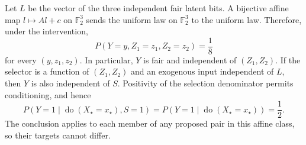 Let \(L\) be the vector of the three independent fair latent bits. A bijective affine map \(l\mapsto Al+c\) on \(\mathbb F_2^3\) sends the uniform law on \(\mathbb F_2^3\) to the uniform law. Therefore, under the intervention,
\[
 P(Y=y,Z_1=z_1,Z_2=z_2)=\frac18
\]
for every \((y,z_1,z_2)\). In particular, \(Y\) is fair and independent of \((Z_1,Z_2)\). If the selector is a function of \((Z_1,Z_2)\) and an exogenous input independent of \(L\), then \(Y\) is also independent of \(S\). Positivity of the selection denominator permits conditioning, and hence
\[
 P(Y=1\mid\operatorname{do}(X_\star=x_\star),S=1)
 =P(Y=1\mid\operatorname{do}(X_\star=x_\star))=\frac12.
\]
The conclusion applies to each member of any proposed pair in this affine class, so their targets cannot differ.